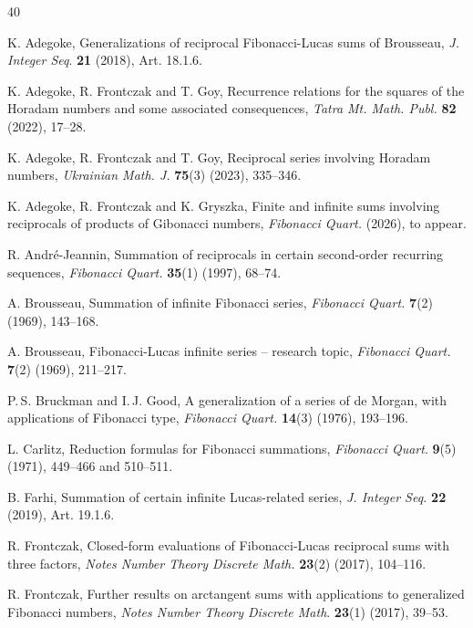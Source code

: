 \documentclass[12pt,reqno]{article}
\begin{document}
	\begin{thebibliography}{40}
	
K. Adegoke, Generalizations of reciprocal Fibonacci-Lucas sums of Brousseau, \textit{J. Integer Seq}. \textbf{21} (2018), Art. 18.1.6.

K. Adegoke, R. Frontczak and T. Goy, Recurrence relations for the squares of the Horadam numbers and some associated consequences, \textit{Tatra Mt. Math. Publ.} \textbf{82} (2022), 17--28. 

K. Adegoke, R. Frontczak and T. Goy, Reciprocal series involving Horadam numbers, \textit{Ukrainian Math. J.} \textbf{75}(3) (2023), 335--346. 

K. Adegoke, R. Frontczak and K. Gryszka, Finite and infinite sums involving reciprocals of products of Gibonacci numbers, 
\textit{Fibonacci Quart.} (2026), to appear.

R. Andr\'{e}-Jeannin, Summation of reciprocals in certain second-order recurring sequences, \textit{Fibonacci Quart.} \textbf{35}(1) (1997), 68--74.

A. Brousseau, Summation of infinite Fibonacci series, \textit{Fibonacci Quart.} \textbf{7}(2) (1969), 143--168.

A. Brousseau, Fibonacci-Lucas infinite series -- research topic, \textit{Fibonacci Quart.} \textbf{7}(2) (1969), 211--217.

P.\,S. Bruckman and I.\,J. Good, A generalization of a series of de Morgan, with applications of Fibonacci type, 
\textit{Fibonacci Quart.} \textbf{14}(3) (1976), 193--196.

L. Carlitz, Reduction formulas for Fibonacci summations, \textit{Fibonacci Quart}. \textbf{9}(5)
(1971), 449--466 and 510--511. 

B. Farhi, Summation of certain infinite Lucas-related series, \textit{J. Integer Seq.} \textbf{22} (2019), Art. 19.1.6.

R. Frontczak, Closed-form evaluations of Fibonacci-Lucas reciprocal sums with three factors, \textit{Notes Number Theory Discrete Math.} \textbf{23}(2) (2017), 104--116.

R. Frontczak, Further results on arctangent sums with applications to generalized Fibonacci numbers, \textit{Notes Number Theory Discrete Math}. \textbf{23}(1) (2017), 39--53.




\end{thebibliography}
\end{document}
